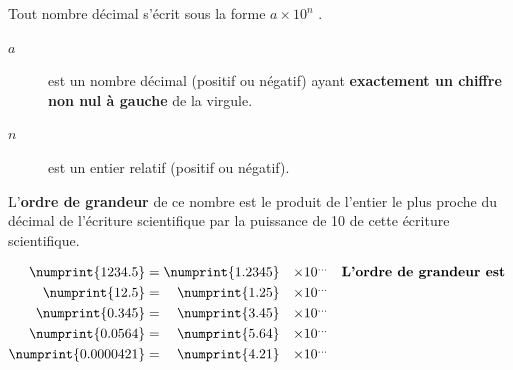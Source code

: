\documentclass[main.tex]{subfiles}
\begin{document}
\begin{theorem}
	Tout nombre décimal s'écrit sous la forme 
	\og $a \times 10^n$ \fg{}.
	\begin{description} 
		\item[$a$] est un nombre décimal (positif ou négatif) ayant \textbf{exactement un chiffre non nul à gauche} de la virgule.
		\item[$n$] est un entier relatif (positif ou négatif). 
	\end{description}  
	L'\textbf{ordre de grandeur} de ce nombre est le produit de l'entier le plus proche du décimal de l'écriture scientifique par la puissance de 10 de cette écriture scientifique.
\end{theorem} 
\begin{example}\hfill
	\[  
	\begin{aligned}
		\numprint{1234.5} &  =	\numprint{1.2345} &\times 10^{\ldots}  && \textbf{L'ordre de grandeur est }\\
		\numprint{12.5} &  =	\quad \numprint{1.25} &\times 10^{\ldots}  \\
		\numprint{0.345} &  =	\quad\numprint{3.45} &\times 10^{\ldots} \\
		\numprint{0.0564} &  =	\quad\numprint{5.64} &\times 10^{\ldots}   \\
		\numprint{0.0000421} &  =	\quad\numprint{4.21} &\times 10^{\ldots}  
	\end{aligned}
	\]	
\end{example}


\newpage 
{}  
\pagestyle{scrheadings} %
\onehalfspacing
\end{document}
